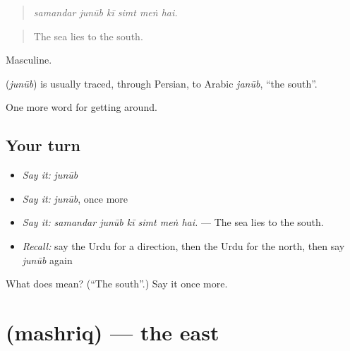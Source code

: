 \begin{quote}
     
\end{quote}

\begin{quote}
\emph{samandar junūb kī simt meṅ hai.}
\end{quote}

\begin{quote}
The sea lies to the south.
\end{quote}

Masculine.

\begin{cousinweb}
\textbf{} (\emph{junūb}) is usually traced, through Persian, to Arabic \emph{janūb}, \textquotedblleft{}the south\textquotedblright{}.
\end{cousinweb}

\begin{grammarlens}[title={What you've built}]
One more word for getting around.
\end{grammarlens}

\subsection*{Your turn}
\begin{itemize}
\raggedright
  \item \emph{Say it:} \emph{junūb}
  \item \emph{Say it:} \emph{junūb}, once more
  \item \emph{Say it:} \emph{samandar junūb kī simt meṅ hai.} — The sea lies to the south.
  \item \emph{Recall:} say the Urdu for a direction, then the Urdu for the north, then say \emph{junūb} again
\end{itemize}

\begin{tcolorbox}[breakable,colback=teal!4,colframe=teal!35!black,title={Before you move on}]
What does  mean? (\textquotedblleft{}The south\textquotedblright{}.) Say it once more.
\end{tcolorbox}
\section[\texorpdfstring{\ur{مشرق} (mashriq)}{مشرق (mashriq)}]{ (mashriq) — the east}

\label{lesson:UR-C408-mashriq}



